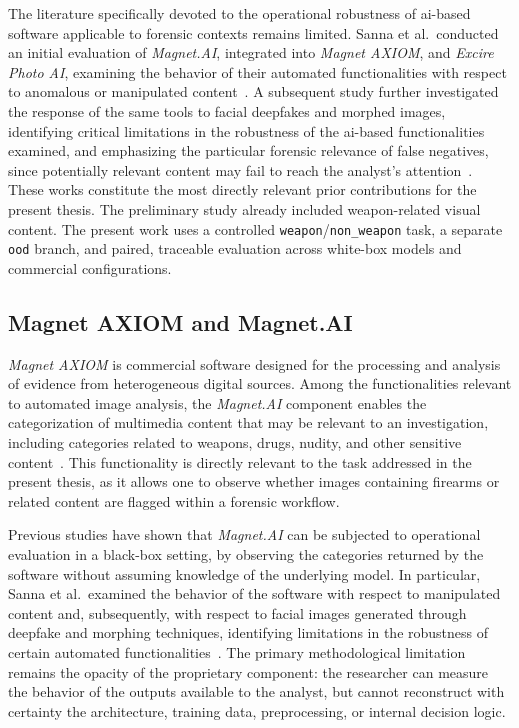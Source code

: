 The literature specifically devoted to the operational robustness of
\gls{ai}-based software applicable to forensic contexts remains limited. Sanna
et al.\ conducted an initial evaluation of \textit{Magnet.AI}, integrated into
\textit{Magnet AXIOM}, and \textit{Excire Photo AI}, examining the behavior of
their automated functionalities with respect to anomalous or manipulated
content~\cite{sanna2024preliminary}. A subsequent study further investigated
the response of the same tools to facial deepfakes and morphed images,
identifying critical limitations in the robustness of the \gls{ai}-based
functionalities examined, and emphasizing the particular forensic relevance of
false negatives, since potentially relevant content may fail to reach the
analyst's attention~\cite{sanna2025pixelperfect}. These works constitute the
most directly relevant prior contributions for the present thesis. The
preliminary study already included weapon-related visual content. The present
work uses a controlled \texttt{weapon}/\texttt{non\_weapon} task, a separate
\texttt{ood} branch, and paired, traceable evaluation across white-box
models and commercial configurations.


\subsection{Magnet AXIOM and Magnet.AI}
\label{subsec:sota_magnet_ai}
\textit{Magnet AXIOM} is commercial software designed for the processing and
analysis of evidence from heterogeneous digital sources. Among the
functionalities relevant to automated image analysis, the \textit{Magnet.AI}
component enables the categorization of multimedia content that may be relevant
to an investigation, including categories related to weapons, drugs, nudity,
and other sensitive content~\cite{magnetai_official,sanna2024preliminary}.
This functionality is directly relevant to the task addressed in the present
thesis, as it allows one to observe whether images containing firearms or
related content are flagged within a forensic workflow.

Previous studies have shown that \textit{Magnet.AI} can be subjected to
operational evaluation in a black-box setting, by observing the categories
returned by the software without assuming knowledge of the underlying model.
In particular, Sanna et al.\ examined the behavior of the software with respect
to manipulated content and, subsequently, with respect to facial images
generated through deepfake and morphing techniques, identifying limitations in
the robustness of certain automated functionalities~\cite{sanna2024preliminary,sanna2025pixelperfect}.
The primary methodological limitation remains the opacity of the proprietary
component: the researcher can measure the behavior of the outputs available to
the analyst, but cannot reconstruct with certainty the architecture, training
data, preprocessing, or internal decision logic.


